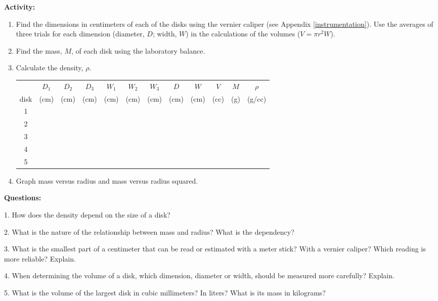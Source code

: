 {\noindent \bf Activity:} \begin{enumerate}

\item Find the dimensions in centimeters of each of the disks using the vernier caliper (see Appendix \ref{instrumentation}). Use the averages of three trials for each dimension (diameter, $D$; width, $W$) in the calculations of the volumes ($V = \pi r^2 W$).
\answerspace{0.5in}

\item Find the mass, $M$, of each disk using the laboratory balance.
\answerspace{0.5in}

\item Calculate the density, $\rho$.
\answerspace{0.5in}

\begin{center} \begin{tabular}{|c|c|c|c|c|c|c|c|c|c|c|c|} \hline \multicolumn{1}{|c||}{} & $D_1$ & $D_2$ & $D_3$ & $W_1$ & $W_2$ & $W_3$ & $D$ & $W$ & $V$ & $M$ & $\rho$\\ \multicolumn{1}{|c||}{disk} & (cm) & (cm) & (cm) & (cm) & (cm) & (cm) & (cm) & (cm) & (cc) & (g) & (g/cc) \\ \hline \hline \multicolumn{1}{|c||}{1} & & & & & & & & & & & \\ \hline \multicolumn{1}{|c||}{2} & & & & & & & & & & & \\ \hline \multicolumn{1}{|c||}{3} & & & & & & & & & & & \\ \hline \multicolumn{1}{|c||}{4} & & & & & & & & & & & \\ \hline \multicolumn{1}{|c||}{5} & & & & & & & & & & & \\ \hline \end{tabular} \end{center}

\item Graph mass versus radius and mass versus radius squared.
\answerspace{0.5in}

\end{enumerate}

\pagebreak[2]

{\noindent \bf Questions:}

1. How does the density depend on the size of a disk? 
\vspace{20mm}

2. What is the nature of the relationship between mass and radius? What is the
dependency? 
\vspace{20mm}

3. What is the smallest part of a centimeter that can be read or estimated with
a meter stick? With a vernier caliper? Which reading is more reliable? Explain.
\vspace{20mm}

4. When determining the volume of a disk, which dimension, diameter or width,
should be measured more carefully? Explain. 
\vspace{20mm}

5. What is the volume of the largest disk in cubic millimeters? In liters? What
is its mass in kilograms?

